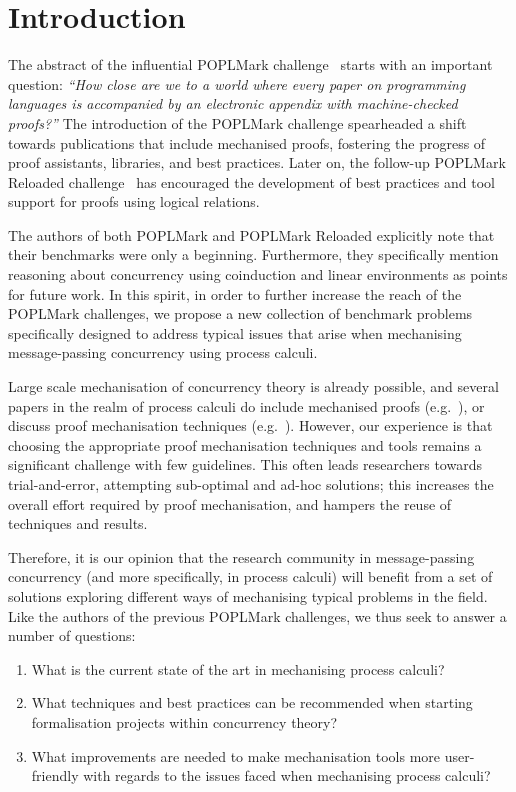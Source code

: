 \documentclass[runningheads]{llncs}
\begin{document}
\section{Introduction}


The abstract of the influential POPLMark challenge~\cite{POPLMark} starts with
an important question: \emph{``How close are we to a world where every paper on
programming languages is accompanied by an electronic appendix with
machine-checked proofs?''} The introduction of the POPLMark
challenge spearheaded a shift towards publications that include
mechanised proofs, fostering the progress of proof assistants,
libraries, and best practices.  Later on, the follow-up POPLMark
Reloaded challenge~\cite{POPLMarkReloaded} has encouraged the development of
best practices and tool support for proofs using logical relations.

The authors of both POPLMark and POPLMark Reloaded explicitly
note that their benchmarks were only a beginning.  Furthermore, they
specifically mention reasoning about concurrency using coinduction and
linear environments as points for future work.  In this spirit, in order to
further increase the reach of the POPLMark challenges, we propose a new
collection of benchmark problems specifically designed to address typical issues
that arise when mechanising message-passing concurrency using process calculi.

Large scale mechanisation of concurrency theory is already possible,
and several papers in the realm of process calculi do include mechanised proofs
(e.g.~\cite{DBLP:conf/pldi/Castro-Perez0GY21,DBLP:conf/tacas/CastroFY20,lmcs:9985,
  DBLP:journals/jar/CruzFilipeMP23, Tirore:2023}), or
discuss proof mechanisation techniques
(e.g.~\cite{DBLP:journals/jar/BengtsonPW16, DBLP:conf/tphol/Gay01,
  DBLP:conf/ppdp/Thiemann19, DBLP:conf/forte/ZalakainD21}).  However, our
experience is that choosing the appropriate proof mechanisation techniques and
tools remains a significant challenge with few guidelines.  This often leads
researchers towards trial-and-error, attempting sub-optimal and ad-hoc
solutions; this increases the overall effort required by proof mechanisation,
and hampers the reuse of techniques and results.

Therefore, it is our opinion that the research community in message-passing
concurrency (and more specifically, in process calculi) will benefit from a set
of solutions exploring different ways of mechanising typical problems in the
field. Like the authors of the previous POPLMark challenges, we thus seek to
answer a number of questions:
\begin{enumerate}
\item What is the current state of the art in mechanising process calculi?
\item What techniques and best practices can be recommended when starting formalisation projects within concurrency theory?
\item What improvements are needed to make mechanisation tools more user-friendly with regards to the issues faced when mechanising process calculi?
\end{enumerate}
\end{document}
